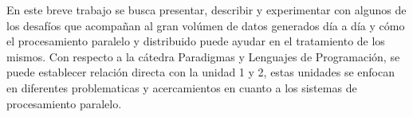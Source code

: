 En este breve trabajo se busca presentar, describir y experimentar con algunos 
de los desafíos que acompañan al
gran volúmen de datos generados día a día y cómo el procesamiento paralelo y distribuido
puede ayudar en el tratamiento de los mismos. Con respecto a la cátedra
Paradigmas y Lenguajes de Programación, se puede establecer relación directa con 
la unidad 1 y 2, estas unidades se enfocan en diferentes problematicas y
acercamientos en cuanto a los sistemas de procesamiento paralelo.
